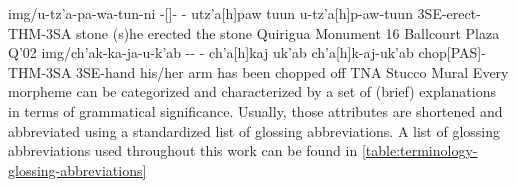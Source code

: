 \documentclass[../main.tex]{subfiles}
\begin{document}
\glyphanalysis
    {img/u-tz'a-pa-wa-tun-ni}
    {-[]- 
    -}
    {utz'a[h]paw tuun}
    {u-tz'a[h]p-aw-\zeromorpheme tuun}
    {3SE-erect-THM-3SA stone}
    {(s)he erected the stone}
    {Quirigua Monument 16 Ballcourt Plaza Q'02}
\glyphanalysis
    {img/ch'ak-ka-ja-u-k'ab}
    {--
    -}
    {ch'a[h]kaj uk'ab}
    {ch'a[h]k-aj-\zeromorpheme uk'ab}
    {chop[PAS]-THM-3SA 3SE-hand}
    {his/her arm has been chopped off}
    {TNA Stucco Mural}
Every morpheme can be categorized and characterized by a set of (brief) explanations in terms 
of grammatical significance. 
Usually, those attributes are shortened and abbreviated using a standardized list of 
glossing abbreviations.
A list of glossing abbreviations used throughout this work can be found in 
\cref{table:terminology-glossing-abbreviations}
\end{document}
